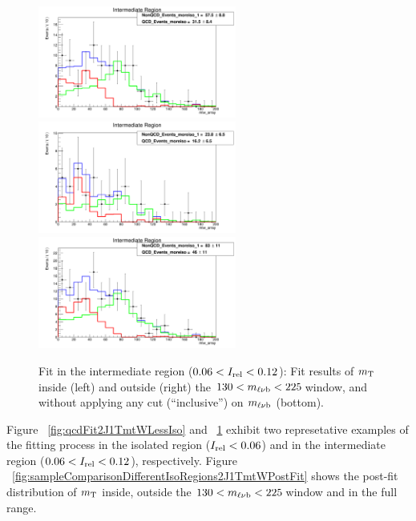 \begin{figure}[h!]
\begin{center}
\includegraphics[width=6.5cm]{figures/2J1T/MTW_fit_2j1t_moreiso_SR.png}
\includegraphics[width=6.5cm]{figures/2J1T/MTW_fit_2j1t_moreiso_SB.png}\hfill
\includegraphics[width=6.5cm]{figures/2J1T/MTW_fit_2j1t_moreiso_inclusive_mTop_range.png}
\caption{\label{fig:qcdFit2J1TmtWMoreIso} Fit in the intermediate region ($0.06< I_{\mathrm{rel}} < 0.12$): Fit results of $m_{\mathrm{\rm T}}$ inside (left) and outside (right) the $130<m_{\ell\nu \mathrm{b}}<225\,$\GeV window, and without applying any cut (``inclusive'') on $m_{\ell\nu \mathrm{b}}$ (bottom). }
\end{center}
\end{figure}



Figure  ~\ref{fig:qcdFit2J1TmtWLessIso} and  ~\ref{fig:qcdFit2J1TmtWMoreIso} exhibit two represetative examples of the fitting process in the isolated region ($I_{\mathrm{rel}} < 0.06$) and in the intermediate region ($0.06 < I_{\mathrm{rel}} < 0.12$), respectively. Figure ~\ref{fig:sampleComparisonDifferentIsoRegions2J1TmtWPostFit} shows the post-fit distribution of $m_{\mathrm{\rm T}}$ inside, outside the $130<m_{\ell\nu \mathrm{b}}<225\,$\GeV window and in the full range.





